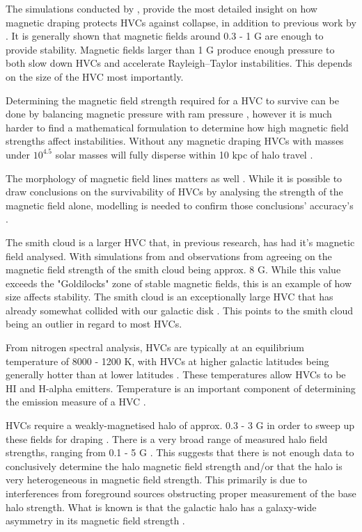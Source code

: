 The simulations conducted by \citep{ID23, ID24, ID33}, provide the most detailed insight on how magnetic draping protects HVCs against collapse, in addition to previous work by \citep{ID11, ID13, ID25}. It is generally shown that magnetic fields around 0.3 - 1 {\textmu}G are enough to provide stability. Magnetic fields larger than 1 {\textmu}G produce enough pressure to both slow down HVCs and accelerate Rayleigh–Taylor instabilities. This depends on the size of the HVC most importantly.

Determining the magnetic field strength required for a HVC to survive can be done by balancing magnetic pressure with ram pressure \cite{ID13}, however it is much harder to find a mathematical formulation to determine how high magnetic field strengths affect instabilities. Without any magnetic draping HVCs with masses under $10^4.5$ solar masses will fully disperse within 10 kpc of halo travel \cite{ID25}.

The morphology of magnetic field lines matters as well \cite{ID24}. While it is possible to draw conclusions on the survivability of HVCs by analysing the strength of the magnetic field alone, modelling is needed to confirm those conclusions' accuracy's \cite{ID5}.

The smith cloud is a larger HVC that, in previous research, has had it's magnetic field analysed. With simulations from \citep{ID23} and observations from \citep{ID28} agreeing on the magnetic field strength of the smith cloud being approx. 8 {\textmu}G. While this value exceeds the "Goldilocks" zone of stable magnetic fields, this is an example of how size affects stability. The smith cloud is an exceptionally large HVC that has already somewhat collided with our galactic disk \cite{ID28, ID35}. This points to the smith cloud being an outlier in regard to most HVCs.

From nitrogen spectral analysis, HVCs are typically at an equilibrium temperature of 8000 - 1200 K, with HVCs at higher galactic latitudes being generally hotter than at lower latitudes \cite{ID48, ID49}. These temperatures allow HVCs to be HI and H-alpha emitters. Temperature is an important component of determining the emission measure of a HVC \cite{ID5, ID26, ID30}.

HVCs require a weakly-magnetised halo of approx. 0.3 - 3 {\textmu}G in order to sweep up these fields for draping \cite{ID13}. There is a very broad range of measured halo field strengths, ranging from 0.1 - 5 {\textmu}G \cite{ID4, ID16, ID21, ID30, ID37, ID42}. This suggests that there is not enough data to conclusively determine the halo magnetic field strength and/or that the halo is very heterogeneous in magnetic field strength. This primarily is due to interferences from foreground sources obstructing proper measurement of the base halo strength. What is known is that the galactic halo has a galaxy-wide asymmetry in its magnetic field strength \cite{ID16, ID30}.

